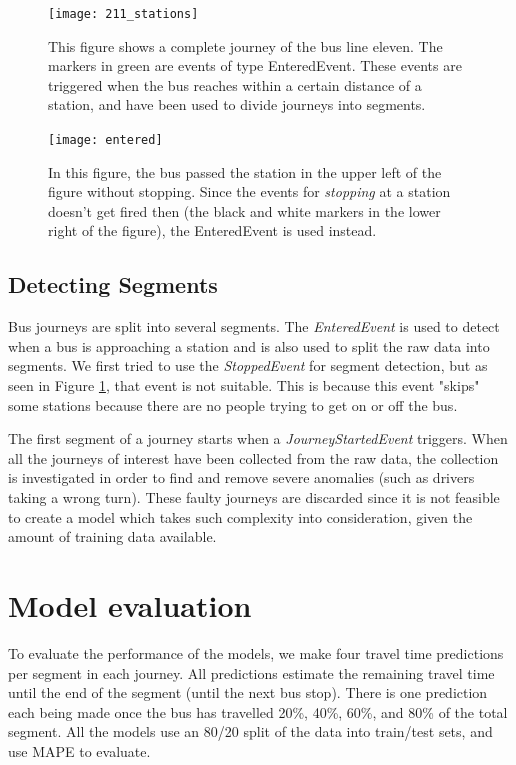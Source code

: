 \begin{figure}[!b]
\begin{minipage}{.5\textwidth}
    \texttt{[image: 211\_stations]}
    \caption{This figure shows a complete journey of the bus line eleven. The markers in green are events of type EnteredEvent. These events are triggered when the bus reaches within a certain distance of a station, and have been used to divide journeys into segments.}
    \label{fig:211_stations}
\end{minipage}
\hspace{5pt}
\begin{minipage}{.48\textwidth}
\texttt{[image: entered]}
\caption{In this figure, the bus passed the station in the upper left of the figure without stopping. Since the events for \textit{stopping} at a station doesn't get fired then (the black and white markers in the lower right of the figure), the EnteredEvent is used instead.}
\label{fig:entered}
\end{minipage}
\end{figure}


\subsection{Detecting Segments}
Bus journeys are split into several segments. The \textit{EnteredEvent} is used to detect when a bus is approaching a station and is also used to split the raw data into segments.  We first tried to use the \textit{StoppedEvent} for segment detection, but as seen in Figure \ref{fig:entered}, that event is not suitable. This is because this event "skips" some stations because there are no people trying to get on or off the bus.

The first segment of a journey starts when a \textit{JourneyStartedEvent} triggers. When all the journeys of interest have been collected from the raw data, the collection is investigated in order to find and remove severe anomalies (such as drivers taking a wrong turn). These faulty journeys are discarded since it is not feasible to create a model which takes such complexity into consideration, given the amount of training data available.

\section{Model evaluation}
To evaluate the performance of the models, we make four travel time predictions per segment in each journey. All predictions estimate the remaining travel time until the end of the segment (until the next bus stop). There is one prediction each being made once the bus has travelled 20\%, 40\%, 60\%, and 80\% of the total segment. All the models use an 80/20 split of the data into train/test sets, and use MAPE to evaluate.

